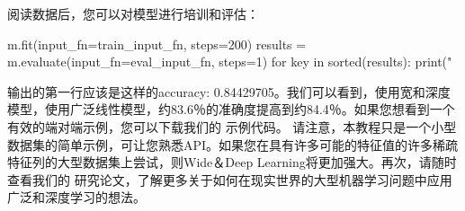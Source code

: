 阅读数据后，您可以对模型进行培训和评估：
\begin{python}
m.fit(input_fn=train_input_fn, steps=200)
results = m.evaluate(input_fn=eval_input_fn, steps=1)
for key in sorted(results):
    print("%
\end{python}
输出的第一行应该是这样的accuracy: 0.84429705。我们可以看到，使用宽和深度模型，使用广泛线性模型，约83.6％的准确度提高到约84.4％。如果您想看到一个有效的端对端示例，您可以下载我们的 示例代码。
请注意，本教程只是一个小型数据集的简单示例，可让您熟悉API。如果您在具有许多可能的特征值的许多稀疏特征列的大型数据集上尝试，则Wide＆Deep Learning将更加强大。再次，请随时查看我们的 研究论文，了解更多关于如何在现实世界的大型机器学习问题中应用广泛和深度学习的想法。
